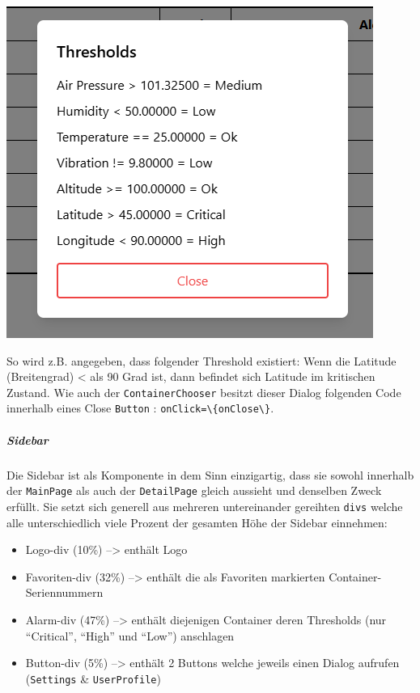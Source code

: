 \documentclass[
    headings=optiontotocandhead,%
    twoside,
    numbers=noenddot,%
    12pt, %
    titlepage, %
    parskip=full, %
    listof=leveldown, 
    numbers=noenddot, %
    a4paper,DIV=14,
    BCOR=15mm,
]{scrbook}
\newcommand{\passthrough}[1]{#1}
\let\origfigure=\figure
\let\endorigfigure=\endfigure
\renewenvironment{figure}[1][]{%
   \origfigure[H]
}{%
   \endorigfigure
}
\providecommand{\tightlist}{%
  \setlength{\itemsep}{0pt}\setlength{\parskip}{0pt}}
\begin{document}
\begin{figure}
\centering
\includegraphics{img/Gekle/ThreshholdViewer.png}
\caption{Threshhold Viewer Dialog}
\end{figure}

So wird z.B. angegeben, dass folgender Threshold existiert: Wenn die
Latitude (Breitengrad) \textless{} als 90 Grad ist, dann befindet sich
Latitude im kritischen Zustand. Wie auch der
\passthrough{\lstinline!ContainerChooser!} besitzt dieser Dialog
folgenden Code innerhalb eines Close \passthrough{\lstinline!Button!} :
\passthrough{\lstinline!onClick=\{onClose\}!}.

\hypertarget{sidebar}{%
\subparagraph{Sidebar}\label{sidebar}}

Die Sidebar ist als Komponente in dem Sinn einzigartig, dass sie sowohl
innerhalb der \passthrough{\lstinline!MainPage!} als auch der
\passthrough{\lstinline!DetailPage!} gleich aussieht und denselben Zweck
erfüllt. Sie setzt sich generell aus mehreren untereinander gereihten
\passthrough{\lstinline!divs!} welche alle unterschiedlich viele Prozent
der gesamten Höhe der Sidebar einnehmen:

\begin{itemize}
\tightlist
\item
  Logo-div (10\%) --\textgreater{} enthält Logo
\item
  Favoriten-div (32\%) --\textgreater{} enthält die als Favoriten
  markierten Container-Seriennummern
\item
  Alarm-div (47\%) --\textgreater{} enthält diejenigen Container deren
  Thresholds (nur ``Critical'', ``High'' und ``Low'') anschlagen
\item
  Button-div (5\%) --\textgreater{} enthält 2 Buttons welche jeweils
  einen Dialog aufrufen (\passthrough{\lstinline!Settings!} \&
  \passthrough{\lstinline!UserProfile!})
\end{itemize}
\end{document}
